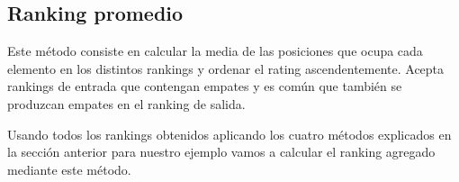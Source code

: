 \subsection{Ranking promedio}

Este método consiste en calcular la media de las posiciones que ocupa cada elemento en los distintos rankings y ordenar el rating ascendentemente. Acepta rankings de entrada que contengan empates y es común que también se produzcan empates en el ranking de salida.\\

\begin{ejem} Usando todos los rankings obtenidos aplicando los cuatro métodos explicados en la sección anterior para nuestro ejemplo vamos a calcular el ranking agregado mediante este método.
\end{ejem}
	

